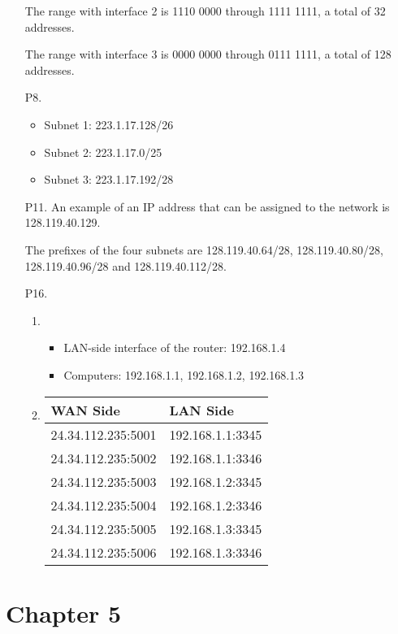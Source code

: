 \documentclass{article}
\begin{document}
\begin{enumerate}
    The range with interface 2 is 1110 0000 through 1111 1111, a total of 32 addresses.

    The range with interface 3 is 0000 0000 through 0111 1111, a total of 128 addresses.

    \item[P8.] \begin{itemize}
        \item Subnet 1: 223.1.17.128/26
        \item Subnet 2: 223.1.17.0/25
        \item Subnet 3: 223.1.17.192/28
    \end{itemize}

    \item[P11.] An example of an IP address that can be assigned to the network is 128.119.40.129.
    
    The prefixes of the four subnets are 128.119.40.64/28, 128.119.40.80/28, 128.119.40.96/28 and 128.119.40.112/28.
 
    \item[P16.] \begin{enumerate}
        \item \begin{itemize}
            \item LAN-side interface of the router: 192.168.1.4
            \item Computers: 192.168.1.1, 192.168.1.2, 192.168.1.3
        \end{itemize}
        \item \begin{tabular}{@{}ll@{}}
            \toprule
            WAN Side & LAN Side \\ \midrule
            24.34.112.235:5001 & 192.168.1.1:3345 \\
            24.34.112.235:5002 & 192.168.1.1:3346 \\
            24.34.112.235:5003 & 192.168.1.2:3345 \\
            24.34.112.235:5004 & 192.168.1.2:3346 \\
            24.34.112.235:5005 & 192.168.1.3:3345 \\
            24.34.112.235:5006 & 192.168.1.3:3346 \\ \bottomrule
        \end{tabular}            
    \end{enumerate}
\end{enumerate}

\section*{Chapter 5}
\end{document}
